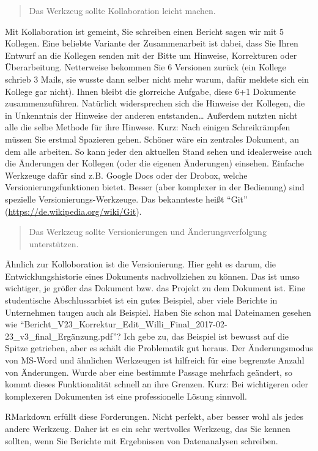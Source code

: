\documentclass[12pt,]{book}
\begin{document}
\begin{quote}
Das Werkzeug sollte Kollaboration leicht machen.
\end{quote}

Mit Kollaboration ist gemeint, Sie schreiben einen Bericht sagen wir mit
5 Kollegen. Eine beliebte Variante der Zusammenarbeit ist dabei, dass
Sie Ihren Entwurf an die Kollegen senden mit der Bitte um Hinweise,
Korrekturen oder Überarbeitung. Netterweise bekommen Sie 6 Versionen
zurück (ein Kollege schrieb 3 Mails, sie wusste dann selber nicht mehr
warum, dafür meldete sich ein Kollege gar nicht). Ihnen bleibt die
glorreiche Aufgabe, diese 6+1 Dokumente zusammenzuführen. Natürlich
widersprechen sich die Hinweise der Kollegen, die in Unkenntnis der
Hinweise der anderen entstanden\ldots{} Außerdem nutzten nicht alle die
selbe Methode für ihre Hinwese. Kurz: Nach einigen Schreikrämpfen müssen
Sie erstmal Spazieren gehen. Schöner wäre ein zentrales Dokument, an dem
alle arbeiten. So kann jeder den aktuellen Stand sehen und idealerweise
auch die Änderungen der Kollegen (oder die eigenen Änderungen) einsehen.
Einfache Werkzeuge dafür sind z.B. Google Docs oder der Drobox, welche
Versionierungsfunktionen bietet. Besser (aber komplexer in der
Bedienung) sind spezielle Versionierungs-Werkzeuge. Das bekannteste
heißt ``Git'' (\url{https://de.wikipedia.org/wiki/Git}).

\begin{quote}
Das Werkzeug sollte Versionierungen und Änderungsverfolgung
unterstützen.
\end{quote}

Ähnlich zur Kolloboration ist die Versionierung. Hier geht es darum, die
Entwicklungshistorie eines Dokuments nachvollziehen zu können. Das ist
umso wichtiger, je größer das Dokument bzw. das Projekt zu dem Dokument
ist. Eine studentische Abschlussarbiet ist ein gutes Beispiel, aber
viele Berichte in Unternehmen taugen auch als Beispiel. Haben Sie schon
mal Dateinamen gesehen wie
``Bericht\_V23\_Korrektur\_Edit\_Willi\_Final\_2017-02-23\_v3\_final\_Ergänzung.pdf''?
Ich gebe zu, das Beispiel ist bewusst auf die Spitze getrieben, aber es
schält die Problematik gut heraus. Der Änderungsmodus von MS-Word und
ähnlichen Werkzeugen ist hilfreich für eine begrenzte Anzahl von
Änderungen. Wurde aber eine bestimmte Passage mehrfach geändert, so
kommt dieses Funktionalität schnell an ihre Grenzen. Kurz: Bei
wichtigeren oder komplexeren Dokumenten ist eine professionelle Lösung
sinnvoll.

RMarkdown erfüllt diese Forderungen. Nicht perfekt, aber besser wohl als
jedes andere Werkzeug. Daher ist es ein sehr wertvolles Werkzeug, das
Sie kennen sollten, wenn Sie Berichte mit Ergebnissen von Datenanalysen
schreiben.
\end{document}
